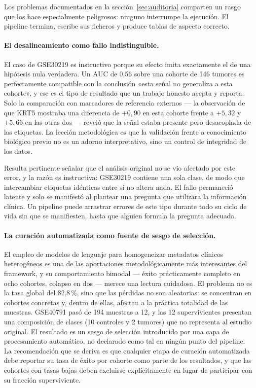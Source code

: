 Los problemas documentados en la sección~\ref{sec:auditoria} comparten un rasgo
que los hace especialmente peligrosos: ninguno interrumpe la ejecución. El
pipeline termina, escribe sus ficheros y produce tablas de aspecto correcto.

\paragraph{El desalineamiento como fallo indistinguible.} El caso de GSE30219 es
instructivo porque su efecto imita exactamente el de una hipótesis nula
verdadera. Un AUC de 0,56 sobre una cohorte de 146 tumores es perfectamente
compatible con la conclusión «esta señal no generaliza a esta cohorte», y ese es
el tipo de resultado que un trabajo honesto acepta y reporta. Solo la
comparación con marcadores de referencia externos --- la observación de que KRT5
mostraba una diferencia de $+0{,}90$ en esta cohorte frente a $+5{,}32$ y
$+5{,}66$ en las otras dos --- reveló que la señal estaba presente pero
desacoplada de las etiquetas. La lección metodológica es que la validación
frente a conocimiento biológico previo no es un adorno interpretativo, sino un
control de integridad de los datos.

Resulta pertinente señalar que el análisis original no se vio afectado por este
error, y la razón es instructiva: GSE30219 contiene una sola clase, de modo que
intercambiar etiquetas idénticas entre sí no altera nada. El fallo permaneció
latente y solo se manifestó al plantear una pregunta que utilizara la
información clínica. Un pipeline puede arrastrar errores de este tipo durante
todo su ciclo de vida sin que se manifiesten, hasta que alguien formula la
pregunta adecuada.

\paragraph{La curación automatizada como fuente de sesgo de selección.} El
empleo de modelos de lenguaje para homogeneizar metadatos clínicos heterogéneos
es una de las aportaciones metodológicamente más interesantes del framework, y
su comportamiento bimodal --- éxito prácticamente completo en ocho cohortes,
colapso en dos --- merece una lectura cuidadosa. El problema no es la tasa
global del 82,8\,\%, sino que las pérdidas no son aleatorias: se concentran en
cohortes concretas y, dentro de ellas, afectan a la práctica totalidad de las
muestras. GSE40791 pasó de 194 muestras a 12, y las 12 supervivientes presentan
una composición de clases (10 controles y 2 tumores) que no representa al
estudio original. El resultado es un sesgo de selección introducido por una capa
de procesamiento automático, no declarado como tal en ningún punto del
pipeline. La recomendación que se deriva es que cualquier etapa de curación
automatizada debe reportar su tasa de éxito por cohorte como parte de los
resultados, y que las cohortes con tasas bajas deben excluirse explícitamente en
lugar de participar con su fracción superviviente.

